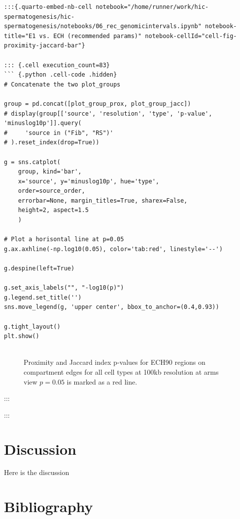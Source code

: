 \documentclass[
  11pt,
  a4paper,
]{scrbook}
\begin{document}
\begin{verbatim}
:::{.quarto-embed-nb-cell notebook="/home/runner/work/hic-spermatogenesis/hic-spermatogenesis/notebooks/06_rec_genomicintervals.ipynb" notebook-title="E1 vs. ECH (recommended params)" notebook-cellId="cell-fig-proximity-jaccard-bar"}

::: {.cell execution_count=83}
``` {.python .cell-code .hidden}
# Concatenate the two plot_groups

group = pd.concat([plot_group_prox, plot_group_jacc])
# display(group[['source', 'resolution', 'type', 'p-value', 'minuslog10p']].query(
#     'source in ("Fib", "RS")'
# ).reset_index(drop=True))

g = sns.catplot(
    group, kind='bar',
    x='source', y='minuslog10p', hue='type', 
    order=source_order,
    errorbar=None, margin_titles=True, sharex=False,
    height=2, aspect=1.5
    )

# Plot a horisontal line at p=0.05
g.ax.axhline(-np.log10(0.05), color='tab:red', linestyle='--')

g.despine(left=True)

g.set_axis_labels("", "-log10(p)")
g.legend.set_title('')
sns.move_legend(g, 'upper center', bbox_to_anchor=(0.4,0.93))

g.tight_layout()
plt.show()


\end{verbatim}

\begin{figure}[H]


\caption{\label{fig-proximity-jaccard-bar}Proximity and Jaccard index
p-values for ECH90 regions on compartment edges for all cell types at
100kb resolution at arms view \(p=0.05\) is marked as a red line.}

\end{figure}%

:::

:::

\chapter{Discussion}\label{discussion-2}

Here is the discussion

\chapter*{Bibliography}\label{bibliography-2}

\begingroup
\raggedright


\endgroup


\backmatter
\end{document}
